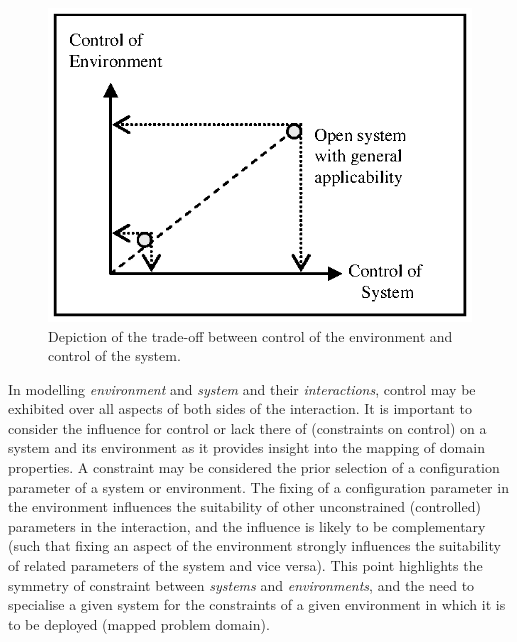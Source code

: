\begin{figure}[ht]
	\centering
	\includegraphics[scale=0.85]{Cells/exposures-tradeoff}
	\caption{Depiction of the trade-off between control of the environment and control of the system.}
	\label{pic:cells:tradeoff}
\end{figure}

In modelling \emph{environment} and \emph{system} and their \emph{interactions}, control may be exhibited over all aspects of both sides of the interaction. It is important to consider the influence for control or lack there of (constraints on control) on a system and its environment as it provides insight into the mapping of domain properties. A constraint may be considered the prior selection of a configuration parameter of a system or environment. The fixing of a configuration parameter in the environment influences the suitability of other unconstrained (controlled) parameters in the interaction, and the influence is likely to be complementary (such that fixing an aspect of the environment strongly influences the suitability of related parameters of the system and vice versa). This point highlights the symmetry of constraint between \emph{systems} and \emph{environments}, and the need to specialise a given system for the constraints of a given environment in which it is to be deployed (mapped problem domain).

%
%
